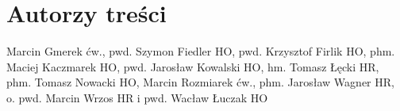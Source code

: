 \chapter{Autorzy treści}

Marcin Gmerek ćw., 
pwd. Szymon Fiedler HO, 
pwd. Krzysztof Firlik HO, 
phm. Maciej Kaczmarek HO, 
pwd. Jarosław Kowalski HO, 
hm. Tomasz Łęcki HR, 
phm. Tomasz Nowacki HO, 
Marcin Rozmiarek ćw., 
phm. Jarosław Wagner HR, 
o. pwd. Marcin Wrzos HR 
i pwd. Wacław Łuczak HO